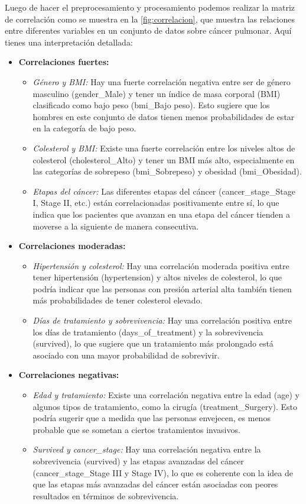 \documentclass[10pt,journal,compsoc]{IEEEtran}
\begin{document}
Luego de hacer el preprocesamiento y procesamiento podemos realizar la matriz de  correlación como se muestra en la \autoref{fig:correlacion}, que muestra las relaciones entre diferentes variables en un conjunto de datos sobre cáncer pulmonar. Aquí tienes una interpretación detallada:
\begin{itemize}
  \item \textbf{Correlaciones fuertes:}
  \begin{itemize}
    \item \emph{Género y BMI:} Hay una fuerte correlación negativa entre ser de género masculino (gender\_Male) y tener un índice de masa corporal (BMI) clasificado como bajo peso (bmi\_Bajo peso). Esto sugiere que los hombres en este conjunto de datos tienen menos probabilidades de estar en la categoría de bajo peso.
    \item \emph{Colesterol y BMI:} Existe una fuerte correlación entre los niveles altos de colesterol (cholesterol\_Alto) y tener un BMI más alto, especialmente en las categorías de sobrepeso (bmi\_Sobrepeso) y obesidad (bmi\_Obesidad).
    \item \emph{Etapas del cáncer: }Las diferentes etapas del cáncer (cancer\_stage\_Stage I, Stage II, etc.) están correlacionadas positivamente entre sí, lo que indica que los pacientes que avanzan en una etapa del cáncer tienden a moverse a la siguiente de manera consecutiva.
  \end{itemize}
  \item \textbf{Correlaciones moderadas:}
  \begin{itemize}
    \item \emph{Hipertensión y colesterol:} Hay una correlación moderada positiva entre tener hipertensión (hypertension) y altos niveles de colesterol, lo que podría indicar que las personas con presión arterial alta también tienen más probabilidades de tener colesterol elevado.
    \item \emph{Días de tratamiento y sobrevivencia:} Hay una correlación positiva entre los días de tratamiento (days\_of\_treatment) y la sobrevivencia (survived), lo que sugiere que un tratamiento más prolongado está asociado con una mayor probabilidad de sobrevivir.
  \end{itemize}
  \item \textbf{Correlaciones negativas:}
  \begin{itemize}
    \item \emph{Edad y tratamiento:} Existe una correlación negativa entre la edad (age) y algunos tipos de tratamiento, como la cirugía (treatment\_Surgery). Esto podría sugerir que a medida que las personas envejecen, es menos probable que se sometan a ciertos tratamientos invasivos.
    \item \emph{Survived y cancer\_stage:} Hay una correlación negativa entre la sobrevivencia (survived) y las etapas avanzadas del cáncer (cancer\_stage\_Stage III y Stage IV), lo que es coherente con la idea de que las etapas más avanzadas del cáncer están asociadas con peores resultados en términos de sobrevivencia.
  \end{itemize}


\end{itemize}
\end{document}
